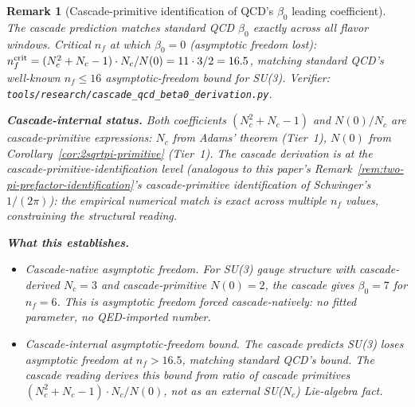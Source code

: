 \documentclass[12pt,a4paper]{article}
\newtheorem*{remark}{Remark}
\begin{document}
\begin{remark}[Cascade-primitive identification of QCD's $\beta_0$ leading coefficient]
The cascade prediction matches standard QCD $\beta_0$ \emph{exactly}
across all flavor windows. Critical $n_f$ at which $\beta_0 = 0$
(asymptotic freedom lost): $n_f^{\rm crit} = (N_c^2 + N_c - 1)\cdot N_c
/ N(0) = 11\cdot 3/2 = 16.5$, matching standard QCD's well-known
$n_f \leq 16$ asymptotic-freedom bound for SU(3). Verifier:
\texttt{tools/research/cascade\_qcd\_beta0\_derivation.py}.

\medskip\noindent\textbf{Cascade-internal status.} Both coefficients
$(N_c^2 + N_c - 1)$ and $N(0)/N_c$ are cascade-primitive expressions:
$N_c$ from Adams' theorem (Tier~1), $N(0)$ from
Corollary~\ref{cor:2sqrtpi-primitive} (Tier~1). The cascade derivation
is at the cascade-primitive-identification level (analogous to
this paper's Remark~\ref{rem:two-pi-prefactor-identification}'s
cascade-primitive identification of Schwinger's $1/(2\pi)$): the
empirical numerical match is exact across multiple $n_f$ values,
constraining the structural reading.

\medskip\noindent\textbf{What this establishes.}
\begin{itemize}[nosep]
\item \emph{Cascade-native asymptotic freedom.} For SU(3) gauge
structure with cascade-derived $N_c = 3$ and cascade-primitive
$N(0) = 2$, the cascade gives $\beta_0 = 7$ for $n_f = 6$. This is
asymptotic freedom forced cascade-natively: no fitted parameter,
no QED-imported number.
\item \emph{Cascade-internal asymptotic-freedom bound.} The cascade
predicts SU(3) loses asymptotic freedom at $n_f > 16.5$, matching
standard QCD's bound. The cascade reading derives this bound from
ratio of cascade primitives $(N_c^2 + N_c - 1)\cdot N_c / N(0)$,
not as an external SU($N_c$) Lie-algebra fact.
\end{itemize}


\end{remark}
\end{document}
